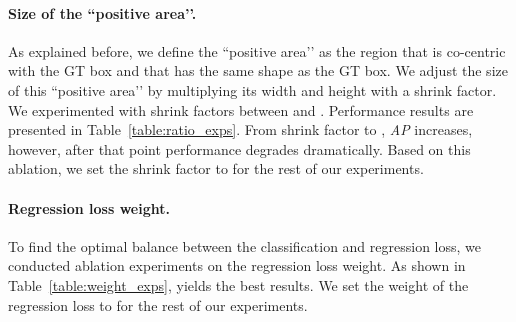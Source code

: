 \documentclass{bmvc2k}
\begin{document}
\paragraph{Size of the ``positive area’’.} As explained before, we define the ``positive area’’ as the region that is co-centric with the GT box and that has the same shape as the GT box. We adjust the size of this ``positive area’’ by multiplying its width and height with a shrink factor. We experimented with shrink factors between  and . Performance results are presented in Table~\ref{table:ratio_exps}. From shrink factor  to , \textit{AP} increases, however, after that point performance degrades  dramatically. Based on this ablation, we set the shrink factor to  for the rest of our experiments.


\begin{table}[h]
\centering
{}
\caption{Experiments to determine the best shrink factor which defines the relative size of the ``positive area’’ with respect to the GT box. Models were trained on \texttt{train2017} and results were obtained  on \texttt{val2017}.}
 \label{table:ratio_exps}
\end{table}




\paragraph{Regression loss weight.} To find the optimal balance between the classification and regression loss, we conducted ablation experiments on the regression loss weight. As shown in  Table~\ref{table:weight_exps},  yields the best results. We set the weight of the regression loss to  for the rest of our experiments.
\end{document}
